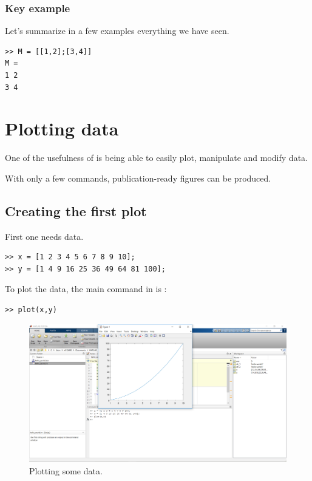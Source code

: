 	\subsection{Key example}
		Let's summarize in a few examples everything we have seen.
\begin{lstlisting}
>> M = [[1,2];[3,4]]
M = 
1 2 
3 4
\end{lstlisting}








\chapter{Plotting data}
One of the usefulness of \matlab is being able to easily plot, manipulate and modify data.

With only a few commands, publication-ready figures can be produced.


\section{Creating the first plot}
	First one needs data.
\begin{lstlisting}
>> x = [1 2 3 4 5 6 7 8 9 10];
>> y = [1 4 9 16 25 36 49 64 81 100];
\end{lstlisting}
	To plot the data, the main command in \matlab is :
\begin{lstlisting}
>> plot(x,y)
\end{lstlisting}

	\begin{figure}
		\center
		\includegraphics[width=0.95\linewidth]{./fig/plot_1.PNG}
		\caption{
			Plotting some data.
			}
		\label{fig-workspace}
	\end{figure}	
	
